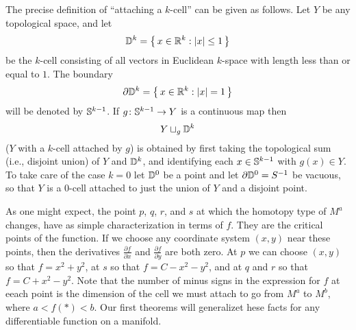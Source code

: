 The precise definition of ``attaching a \(k\)-cell'' can be given as
follows. Let \(Y\) be any topological space, and let
\[
  \mathbb{D}^k=\bigl\{\,x\in\mathbb{R}^k: |x|\leq 1\,\bigr\}
\]
be the \(k\)-cell consisting of all vectors in Euclidean \(k\)-space with
length less than or equal to \(1\). The boundary
\[
  \partial \mathbb{D}^k=\bigl\{\,x\in\mathbb{R}^k:|x|=1\,\bigr\}
\]
will be denoted by \(\mathbb{S}^{k-1}\). If \(g\colon \mathbb{S}^{k-1}\to Y\) is a continuous
map then
\[
  Y\sqcup_g \mathbb{D}^k
\]
(\(Y\) with a \(k\)-cell attached by \(g\)) is obtained by first taking the
topological sum (i.e., disjoint union) of \(Y\) and \(\mathbb{D}^k\), and
identifying each \(x\in \mathbb{S}^{k-1}\) with \(g(x)\in Y\). To take care of
the case \(k=0\) let \(\mathbb{D}^0\) be a point and let
\(\partial\mathbb{D}^0=S^{-1}\) be vacuous, so that \(Y\) is a \(0\)-cell
attached to just the union of \(Y\) and a disjoint point.

As one might expect, the point \(p\), \(q\), \(r\), and \(s\) at which the
homotopy type of \(M^a\) changes, have as simple characterization in terms
of \(f\). They are the critical points of the function. If we choose any
coordinate system \((x,y)\) near these points, then the derivatives
\(\frac{\partial f}{\partial x}\) and \(\frac{\partial f}{\partial y}\) are
both zero. At \(p\) we can choose \((x,y)\) so that \(f=x^2+y^2\), at
\(s\) so that \(f=C-x^2-y^2\), and at \(q\) and \(r\) so that
\(f=C+x^2-y^2\). Note that the number of minus signs in the expression for
\(f\) at eeach point is the dimension of the cell we must attach to go from
\(M^a\) to \(M^b\), where \(a<f(*)<b\). Our first theorems will generalizet
hese facts for any differentiable function on a manifold.

